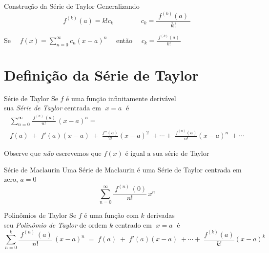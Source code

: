 \begin{frame}{Construção da Série de Taylor}
  Generalizando
  \[
    f^{(k)}(a) = k!c_k  \qquad\qquad c_k = \frac{\;f^{(k)}(a)\;}{k!}
  \]

  \pause
  \vspace{\baselineskip}
  Se    \(\quad f(x) = \sum_{n=0}^{\infty} c_n (x-a)^n \quad \)
  então \(\quad c_k = \frac{\;f^{(k)}(a)\;}{k!} \quad \)
\end{frame}

\section{Definição da Série de Taylor}

\begin{frame}{Série de Taylor}
  Se $f$ é uma função infinitamente derivável \\
  sua \emph{Série de Taylor} centrada em $\;x=a\;$ é
  \begin{multline*}
    \sum_{n=0}^\infty \frac{\;f^{(n)\;}(a)}{n!}\,(x-a)^n = \\
    f(a)\;+\;f'(a)(x-a)\;+\;\frac{f''(a)}{2!}(x-a)^2\;+\cdots+\;\frac{f^{(n)}(a)}{n!}(x-a)^n\;+\cdots
  \end{multline*}

  \pause
  \vspace{\baselineskip}
  Observe que \emph{não} escrevemos que $f(x)$ é igual a sua série de Taylor
\end{frame}

\begin{frame}{Série de Maclaurin}
  Uma Série de Maclaurin é uma Série de Taylor centrada em zero, $a=0$
  \[
    \sum_{n=0}^\infty \frac{\;f^{(n)\;}(0)}{n!}\,x^n
  \]
\end{frame}

\begin{frame}{Polinômios de Taylor}
  Se $f$ é uma função com $k$ derivadas \\
  seu \emph{Polinômio de Taylor} de ordem $k$ centrado em $\;x=a\;$ é
  \[
    \sum_{n=0}^k \frac{\;f^{(n)\;}(a)}{n!}\,(x-a)^n
      \;=\; f(a)
      \;+\;f'(a)(x-a)
      \;+\cdots+\; \frac{f^{(k)}(a)}{k!}(x-a)^k
    \]
\end{frame}

